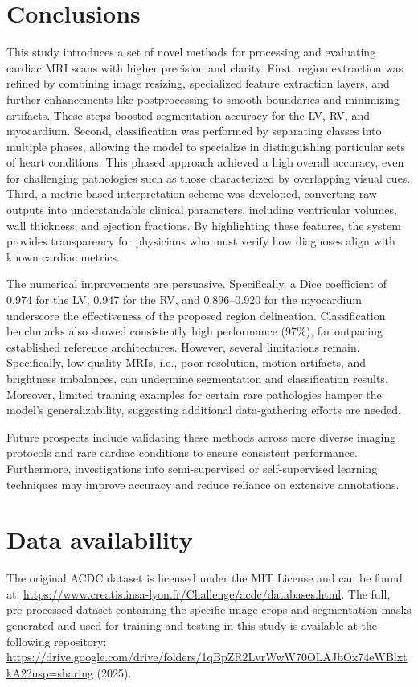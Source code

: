 \documentclass[fleqn,10pt]{wlscirep}
\begin{document}
\section*{Conclusions}

This study introduces a set of novel methods for processing and evaluating cardiac MRI scans with higher precision and clarity. First, region extraction was refined by combining image resizing, specialized feature extraction layers, and further enhancements like postprocessing to smooth boundaries and minimizing artifacts. These steps boosted segmentation accuracy for the LV, RV, and myocardium. Second, classification was performed by separating classes into multiple phases, allowing the model to specialize in distinguishing particular sets of heart conditions. This phased approach achieved a high overall accuracy, even for challenging pathologies such as those characterized by overlapping visual cues. Third, a metric-based interpretation scheme was developed, converting raw outputs into understandable clinical parameters, including ventricular volumes, wall thickness, and ejection fractions. By highlighting these features, the system provides transparency for physicians who must verify how diagnoses align with known cardiac metrics.

The numerical improvements are persuasive. Specifically, a Dice coefficient of 0.974 for the LV, 0.947 for the RV, and 0.896–0.920 for the myocardium underscore the effectiveness of the proposed region delineation. Classification benchmarks also showed consistently high performance (97\%), far outpacing established reference architectures. However, several limitations remain. Specifically, low-quality MRIs, i.e., poor resolution, motion artifacts, and brightness imbalances, can undermine segmentation and classification results. Moreover, limited training examples for certain rare pathologies hamper the model’s generalizability, suggesting additional data-gathering efforts are needed.

Future prospects include validating these methods across more diverse imaging protocols and rare cardiac conditions to ensure consistent performance. Furthermore, investigations into semi-supervised or self-supervised learning techniques may improve accuracy and reduce reliance on extensive annotations.

\section*{Data availability}
The original ACDC dataset is licensed under the MIT License and can be found at: \url{https://www.creatis.insa-lyon.fr/Challenge/acdc/databases.html}. The full, pre-processed dataset containing the specific image crops and segmentation masks generated and used for training and testing in this study is available at the following repository: \url{https://drive.google.com/drive/folders/1qBpZR2LvrWwW70OLAJbOx74eWBlxtkA2?usp=sharing} (2025).
\end{document}

